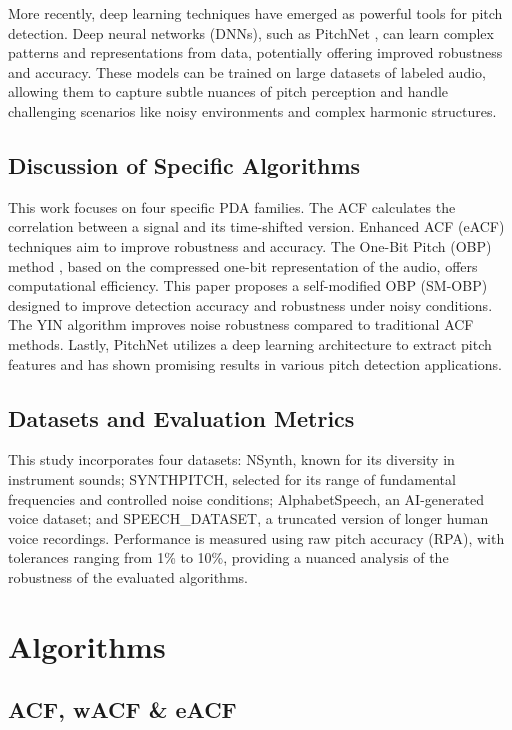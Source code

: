 \documentclass{ieeeaccess}
\begin{document}
More recently, deep learning techniques have emerged as powerful tools for pitch detection. Deep neural networks (DNNs), such as PitchNet \cite{b5}, can learn complex patterns and representations from data, potentially offering improved robustness and accuracy. These models can be trained on large datasets of labeled audio, allowing them to capture subtle nuances of pitch perception and handle challenging scenarios like noisy environments and complex harmonic structures.

\subsection{Discussion of Specific Algorithms}
This work focuses on four specific PDA families. The ACF \cite{b3} calculates the correlation between a signal and its time-shifted version. Enhanced ACF (eACF) techniques \cite{b2} aim to improve robustness and accuracy. The One-Bit Pitch (OBP) method \cite{b7}, based on the compressed one-bit representation of the audio, offers computational efficiency. This paper proposes a self-modified OBP (SM-OBP) designed to improve detection accuracy and robustness under noisy conditions. The YIN algorithm \cite{b1} improves noise robustness compared to traditional ACF methods. Lastly, PitchNet \cite{b5} utilizes a deep learning architecture to extract pitch features and has shown promising results in various pitch detection applications.

\subsection{Datasets and Evaluation Metrics}
This study incorporates four datasets: NSynth, known for its diversity in instrument sounds; SYNTHPITCH, selected for its range of fundamental frequencies and controlled noise conditions; AlphabetSpeech, an AI-generated voice dataset; and SPEECH\_DATASET, a truncated version of longer human voice recordings. Performance is measured using raw pitch accuracy (RPA), with tolerances ranging from 1\% to 10\%, providing a nuanced analysis of the robustness of the evaluated algorithms.


\section{Algorithms}
\subsection{ ACF, \lowercase{w}ACF \& \lowercase{e}ACF}
\end{document}
